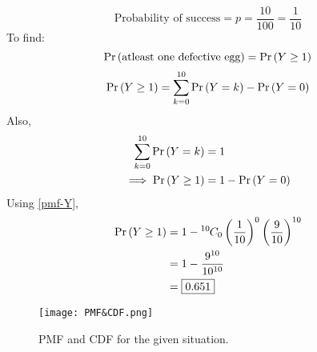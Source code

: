\documentclass[journal,12pt,two column]{IEEEtran}
\begin{document}
\begin{equation}
    \text{Probability of success} = p = \frac{10}{100} = \frac{1}{10} 
\end{equation}
To find:
\begin{equation}
    \Pr\left(\text{atleast one defective egg}\right) = \Pr\left(Y \ge 1\right) 
\end{equation}
\begin{equation}
    \Pr\left(Y \ge 1\right) = \sum_{k=0}^{10} \Pr\left(Y = k\right) - \Pr\left(Y = 0\right)
\end{equation}
Also,
\begin{align}
    \sum_{k=0}^{10} \Pr\left(Y = k\right) &= 1 \\
    \implies \Pr\left(Y \ge 1\right) &= 1 - \Pr\left(Y = 0\right)
\end{align}
Using \eqref{pmf-Y},
\begin{align}
 \Pr\left(Y \ge 1\right) &= 1 - {{}^{10}\mkern-1muC_{0}} \left(\frac{1}{10}\right)^0 \left(\frac{9}{10}\right)^{10} \\
            &= 1 - \frac{9^{10}}{10^{10}} \\
            &= \boxed{0.651}
\end{align}
\begin{figure}[!ht]
\texttt{[image: PMF\&CDF.png]}
\caption{PMF and CDF for the given situation.}
\label{Fig 1}
\end{figure}
\end{document}
